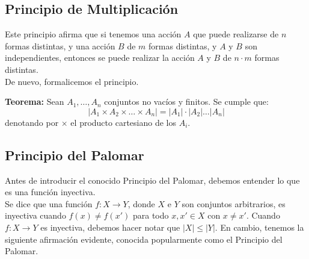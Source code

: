 \documentclass[12pt]{article}
\theoremstyle{definition}
\theoremstyle{plain}
\theoremstyle{plain}
\theoremstyle{definition}
\begin{document}
    \subsection{Principio de Multiplicación}

        Este principio afirma que si tenemos una acción \(A\) que puede realizarse de \(n\) formas distintas, y una acción \(B\) de \(m\) formas distintas, y \(A\) y \(B\) son independientes, entonces se puede realizar la acción \(A\) y \(B\) de \(n \cdot m\) formas distintas.\\
        De nuevo, formalicemos el principio.

        \textbf{Teorema:}
        Sean $A_1, \dots, A_n$ conjuntos no vacíos y finitos. Se cumple que:$$|A_1 \times A_2 \times \dots \times A_n| = |A_1| \cdot |A_2| \dots |A_n|$$denotando por $\times$ el producto cartesiano de los $A_i$.


    \subsection{Principio del Palomar}

        Antes de introducir el conocido Principio del Palomar, debemos entender lo que es una función inyectiva.\\
        Se dice que una función \(f:X \rightarrow Y\), donde \(X\) e \(Y\) son conjuntos arbitrarios, es inyectiva cuando \(f(x) \neq f(x')\) para todo \(x,x' \in X\) con \(x \neq x'\). Cuando \(f:X \rightarrow Y\) es inyectiva, debemos hacer notar que \(|X| \leq |Y|\). En cambio, tenemos la siguiente afirmación evidente, conocida popularmente como el Principio del Palomar.
\end{document}
